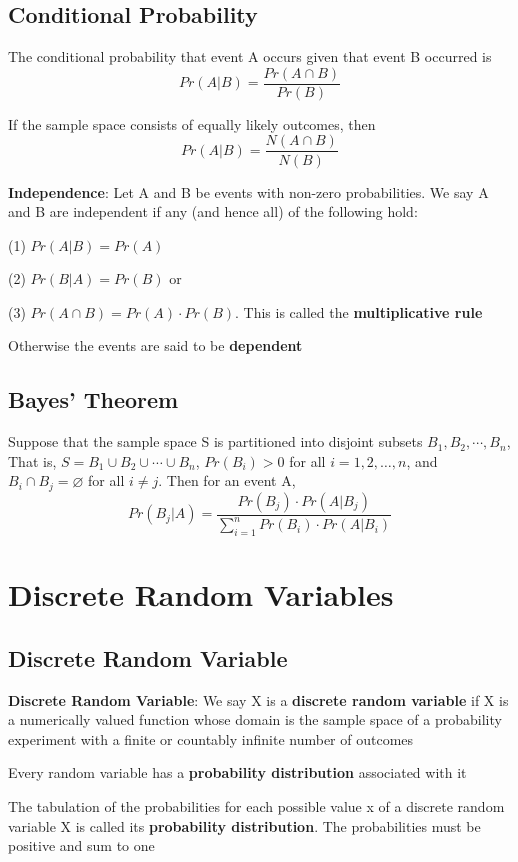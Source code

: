 \documentclass[12pt]{article}
\begin{document}
\begin{spacing}{2.0}
\subsection{Conditional Probability}

The conditional probability that event A occurs given that event B occurred is $$Pr(A|B)= \frac{Pr(A \cap B)}{Pr(B)}$$

If the sample space consists of equally likely outcomes, then $$Pr(A|B)= \frac{N(A \cap B)}{N(B)}$$

\textbf{Independence}: Let A and B be events with non-zero probabilities. We say A and B are independent if any (and hence all) of the following hold:

(1) $Pr(A|B)=Pr(A)$

(2) $Pr(B|A)= Pr(B)$ or

(3) $Pr(A\cap B)= Pr(A) \cdot Pr(B)$. This is called the \textbf{multiplicative rule}

Otherwise the events are said to be \textbf{dependent}

\subsection{Bayes' Theorem}

Suppose that the sample space S is partitioned into disjoint subsets $B_1, B_2, \cdots , B_n$, That is, $S=B_1 \cup B_2 \cup \cdots \cup B_n$, $Pr(B_i) >0$ for all $i=1,2,\ldots,n$, and $B_i \cap B_j = \varnothing$ for all $i \ne j$. Then for an event A, $$Pr(B_j|A) = \frac{Pr(B_j)\cdot Pr(A|B_j)}{\sum\limits_{i=1}^{n} Pr(B_i) \cdot Pr(A|B_i)}$$

\section{Discrete Random Variables}

\subsection{Discrete Random Variable}

\textbf{Discrete Random Variable}: We say X is a \textbf{discrete random variable} if X is a numerically valued function whose domain is the sample space of a probability experiment with a finite or countably infinite number of outcomes

Every random variable has a \textbf{probability distribution} associated with it

The tabulation of the probabilities for each possible value x of a discrete random variable X is called its \textbf{probability distribution}. The probabilities must be positive and sum to one


\end{spacing}
\end{document}
